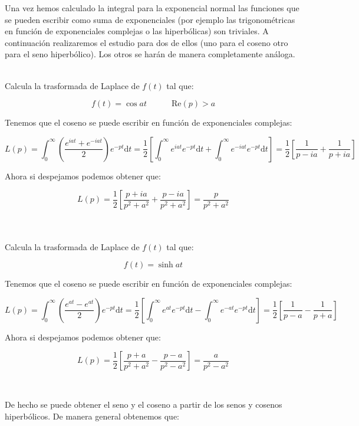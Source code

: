 \documentclass[12pt,a4paper]{book}
\newcommand{\parentesis}[1]{\left( #1  \right)}
\newcommand{\D}{\mathrm{d}}
\newcommand{\Real}{\mathrm{Re}}
\newcommand{\into}{\int_{0}^{\infty}}
\newcommand{\tquad}{\quad  \quad \quad}
\begin{document}
Una vez hemos calculado la integral para la exponencial normal las funciones que se pueden escribir como suma de exponenciales (por ejemplo las trigonométricas en función de exponenciales complejas o las hiperbólicas) son triviales. A continuación realizaremos el estudio para dos de ellos (uno para el coseno otro para el seno hiperbólico). Los otros se harán de manera completamente análoga. \\



\begin{flushleft}

\hrulefill \\
Calcula la trasformada de Laplace de $f(t)$ tal que:

$$ f(t) = \cos at \tquad \Real(p) > a $$

Tenemos que el coseno se puede escribir en función de exponenciales complejas:

$$ L(p) = \into \parentesis{\dfrac{e^{iat}+e^{-iat}}{2}} e^{-pt} \D t = \dfrac{1}{2} \left[ \into e^{iat} e^{-pt} \D t + \into e^{-iat} e^{-pt} \D t \right] = \dfrac{1}{2} \left[ \dfrac{1}{p-ia} + \dfrac{1}{p+ia} \right] $$

Ahora si despejamos podemos obtener que:

$$ L(p) = \dfrac{1}{2} \left[ \dfrac{p+ia}{p^2+a^2} + \dfrac{p-ia}{p^2+a^2} \right] = \dfrac{p}{p^2 + a^2}  $$

\hrulefill \\

\hrulefill \\
Calcula la trasformada de Laplace de $f(t)$ tal que:

$$ f(t) = \sinh at $$

Tenemos que el coseno se puede escribir en función de exponenciales complejas:

$$ L(p) = \into \parentesis{\dfrac{e^{at}-e^{at}}{2}} e^{-pt} \D t = \dfrac{1}{2} \left[ \into e^{at} e^{-pt} \D t - \into e^{-at} e^{-pt} \D t \right] = \dfrac{1}{2} \left[ \dfrac{1}{p-a} - \dfrac{1}{p+a} \right] $$

Ahora si despejamos podemos obtener que:

$$ L(p) = \dfrac{1}{2} \left[ \dfrac{p+a}{p^2+a^2} - \dfrac{p - a}{p^2 - a^2} \right] = \dfrac{a}{p^2 - a^2}  $$

\hrulefill \\ 
\end{flushleft}


De hecho se puede obtener el seno y el coseno a partir de los senos y cosenos hiperbólicos. De manera general obtenemos que:
\end{document}
